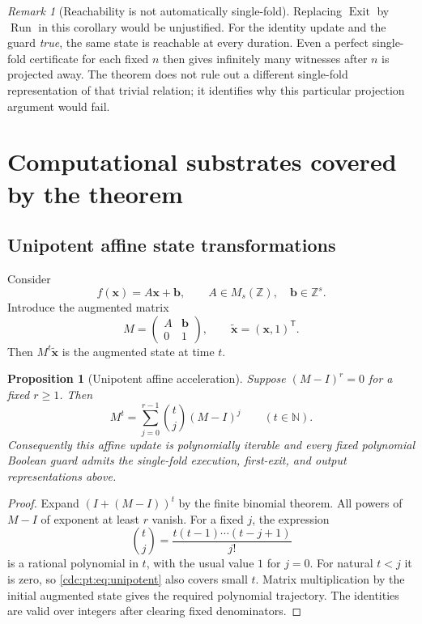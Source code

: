 \documentclass[11pt,a4paper]{article}
\newtheorem{proposition}[proposition]{Proposition}
\theoremstyle{definition}
\theoremstyle{remark}
\newtheorem{remark}[remark]{Remark}
\newcommand{\N}{\mathbb N}
\newcommand{\Z}{\mathbb Z}
\newcommand{\Run}{\operatorname{Run}}
\newcommand{\Exit}{\operatorname{Exit}}
\newcommand{\srctag}[1]{\texorpdfstring{\hspace{0.5em}{\normalfont\small\color{accent}[#1]}}{ [#1]}}
\begin{document}
\begin{remark}[Reachability is not automatically single-fold]
Replacing $\Exit$ by $\Run$ in this corollary would be unjustified. For the
identity update and the guard \emph{true}, the same state is reachable at
every duration. Even a perfect single-fold certificate for each fixed
$n$ then gives infinitely many witnesses after $n$ is projected away.
The theorem does not rule out a different single-fold representation of
that trivial relation; it identifies why this particular projection
argument would fail.
\end{remark}

\section{Computational substrates covered by the theorem\srctag{02}}
\label{cdc:pt:sec:substrates}

\subsection{Unipotent affine state transformations}
Consider
\[
 f(\boldsymbol x)=A\boldsymbol x+\boldsymbol b,
 \qquad A\in M_s(\Z),\quad\boldsymbol b\in\Z^s.
\]
Introduce the augmented matrix
\[
 M=\begin{pmatrix} A&\boldsymbol b\\0&1\end{pmatrix},
 \qquad \widetilde{\boldsymbol x}=(\boldsymbol x,1)^{\mathsf T}.
\]
Then $M^t\widetilde{\boldsymbol x}$ is the augmented state at time $t$.

\begin{proposition}[Unipotent affine acceleration]
\label{cdc:pt:prop:unipotent}
Suppose $(M-I)^r=0$ for a fixed $r\geq1$. Then
\begin{equation}
 M^t=\sum_{j=0}^{r-1}\binom tj(M-I)^j\qquad(t\in\N).
 \label{cdc:pt:eq:unipotent}
\end{equation}
Consequently this affine update is polynomially iterable and every fixed
polynomial Boolean guard admits the single-fold execution, first-exit,
and output representations above.
\end{proposition}
\begin{proof}
Expand $(I+(M-I))^t$ by the finite binomial theorem. All powers of
$M-I$ of exponent at least $r$ vanish. For a fixed $j$, the expression
\[
 \binom tj=\frac{t(t-1)\cdots(t-j+1)}{j!}
\]
is a rational polynomial in $t$, with the usual value $1$ for $j=0$.
For natural $t<j$ it is zero, so \eqref{cdc:pt:eq:unipotent} also covers small
$t$. Matrix multiplication by the initial augmented state gives the
required polynomial trajectory. The identities are valid over integers
after clearing fixed denominators.
\end{proof}
\end{document}
